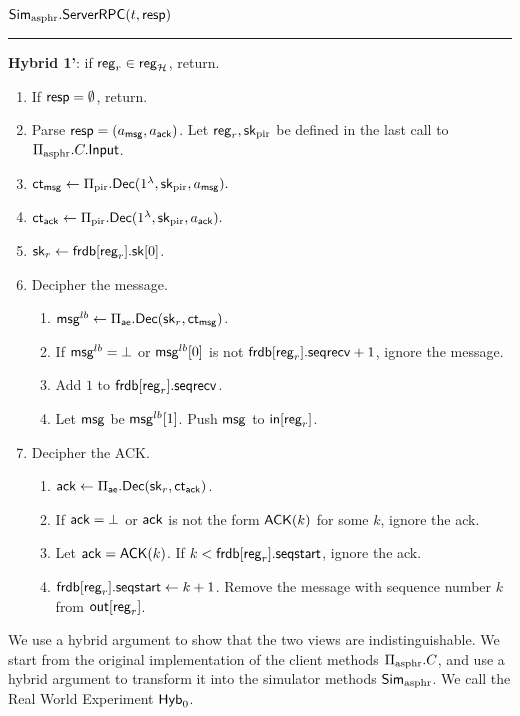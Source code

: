 \vspace{10pt}
$\mathbf{\mathsf{Sim}_{\text{asphr}}.\mathsf{ServerRPC}}(t, \mathsf{resp})$
\vspace{5pt}
\hrule
\vspace{5pt}
\begin{siderule}
{ \textbf{Hybrid 1'}: if $\mathsf{reg}_r \in \mathsf{reg}_{\mathcal{H}}$, return.}
\end{siderule}
\begin{enumerate}
    \item If $\mathsf{resp} = \emptyset$, return.
    \item Parse $\mathsf{resp} = (a_{\mathsf{msg}}, a_{\mathsf{ack}})$. Let $\mathsf{reg}_r, {\mathsf{sk}}_{\text{pir}}$ be defined in the last call to $\Pi_{\text{asphr}}.C.\mathsf{Input}$.
    \item $\mathsf{ct}_{\mathsf{msg}} \leftarrow \Pi_{\text{pir}}.\mathsf{Dec}(1^{\lambda}, {\mathsf{sk}}_{\text{pir}}, a_{\mathsf{msg}}).$
    \item $\mathsf{ct}_{\mathsf{ack}} \leftarrow \Pi_{\text{pir}}.\mathsf{Dec}(1^{\lambda}, {\mathsf{sk}}_{\text{pir}}, a_{\mathsf{ack}}).$
    \item ${\mathsf{sk}}_r \leftarrow \mathsf{frdb}[\mathsf{reg}_r].{\mathsf{sk}}[0]$.
    \item Decipher the message.
    \begin{enumerate}
        \item $\mathsf{msg}^{lb} \leftarrow \Pi_{\mathsf{ae}}.\mathsf{Dec}({\mathsf{sk}}_r, \mathsf{ct}_{\mathsf{msg}})$.
        \item If $\mathsf{msg}^{lb} = \bot$ or $\mathsf{msg}^{lb}[0]$ is not $\mathsf{frdb}[\mathsf{reg}_r].\mathsf{seqrecv} + 1$, ignore the message.
        \item Add $1$ to $\mathsf{frdb}[\mathsf{reg}_r].\mathsf{seqrecv}$. 
        \item Let $\mathsf{msg}$ be $\mathsf{msg}^{lb}[1]$. Push $\mathsf{msg}$ to $\mathsf{in}[\mathsf{reg}_r]$.
    \end{enumerate}
    \item Decipher the ACK.
    \begin{enumerate}
        \item $\mathsf{ack} \leftarrow \Pi_{\mathsf{ae}}.\mathsf{Dec}({\mathsf{sk}}_r, \mathsf{ct}_{\mathsf{ack}})$.
        \item If $\mathsf{ack} = \bot$ or $\mathsf{ack}$ is not the form $\mathsf{ACK}(k)$ for some $k$, ignore the ack.
        \item Let $\mathsf{ack} = \mathsf{ACK}(k)$. If $k < \mathsf{frdb}[\mathsf{reg}_r].\mathsf{seqstart}$, ignore the ack.
        \item $\mathsf{frdb}[\mathsf{reg}_r].\mathsf{seqstart} \leftarrow k + 1$. Remove the message with sequence number $k$ from $\mathsf{out}[\mathsf{reg}_r]$.
    \end{enumerate}
\end{enumerate}

We use a hybrid argument to show that the two views are indistinguishable. We start from the original implementation of the client methods $\Pi_{\text{asphr}}.C$, and use a hybrid argument to transform it into the simulator methods $\mathsf{Sim}_{\text{asphr}}$. We call the Real World Experiment $\mathsf{Hyb}_0$.  

